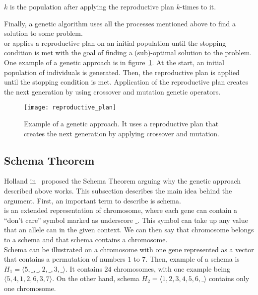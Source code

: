  $k$ is the population after applying the reproductive plan $k$-times to it.\\

\newpage

Finally, a genetic algorithm uses all the processes mentioned above to
find a solution to some problem.\\

 or  applies a reproductive plan
on an initial population until the stopping condition is met with the
goal of finding a (sub)-optimal solution to the problem.\\

One example of a genetic approach is in figure~\ref{fig:reproductive-plan}.
At the start, an initial population of individuals is generated.
Then, the reproductive plan is applied until the stopping condition is met.
Application of the reproductive plan creates the next generation by using crossover and mutation genetic operators.

\begin{figure}[h]
    \texttt{[image: reproductive\_plan]}
    \caption[Example of a genetic approach]{
        Example of a genetic approach.
        It uses a reproductive plan that creates the next generation by applying crossover and mutation.}
    \label{fig:reproductive-plan}
\end{figure}

\subsection{Schema Theorem}\label{subsec:schema-theorem}

Holland in~\cite{hollandAdaptationNaturalArtificial1975} proposed
the Schema Theorem arguing why the genetic approach described above works.
This subsection describes the main idea behind the argument.
First, an important term to describe is schema.\\

 is an extended representation of chromosome,
where each gene can contain a “don’t care” symbol marked as underscore $\_$.
This symbol can take up any value that an allele can in the given context.
We can then say that chromosome belongs to a schema
and that schema contains a chromosome.\\

Schema can be illustrated on a chromosome with one gene represented as a vector that contains a permutation of numbers $1$ to $7$.
Then, example of a schema is $H_1 = \langle 5, \_, \_, 2, \_, 3, \_ \rangle$.
It contains $24$ chromosomes, with one example being $\langle 5, 4, 1, 2, 6, 3, 7 \rangle$.
On the other hand, schema $H_2 = \langle 1, 2, 3, 4, 5, 6, \_ \rangle$ contains only one chromosome.

